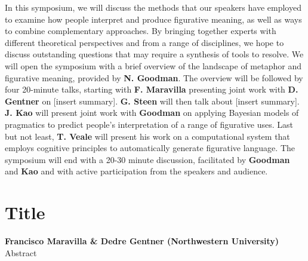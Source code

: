 \documentclass[10pt,letterpaper]{article}
\begin{document}
In this symposium, we will discuss the methods that our speakers have employed to examine how people interpret and produce figurative meaning, as well as ways to combine complementary approaches. By bringing together experts with different theoretical perspectives and from a range of disciplines, we hope to discuss outstanding questions that may require a synthesis of tools to resolve. We will open the symposium with a brief overview of the landscape of metaphor and figurative meaning, provided by \textbf{N. Goodman}. The overview will be followed by four 20-minute talks, starting with \textbf{F. Maravilla} presenting joint work with \textbf{D. Gentner} on [insert summary].
\textbf{G. Steen} will then talk about [insert summary]. \textbf{J. Kao} will present joint work with \textbf{Goodman} on applying Bayesian models of pragmatics to predict people's interpretation of a range of figurative uses. Last but not least, \textbf{T. Veale} will present his work on a computational system that employs cognitive principles to automatically generate figurative language.
The symposium will end with a 20-30 minute discussion, facilitated by \textbf{Goodman} and \textbf{Kao} and with active participation from the speakers and audience.	


\section{Title}
\large \textbf{Francisco Maravilla \& Dedre Gentner (Northwestern University)}\\
Abstract
\end{document}
